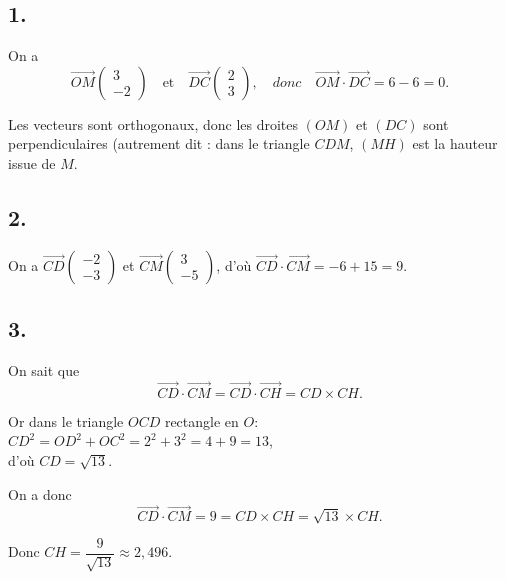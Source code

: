 \subsection*{1.}
	
	On a
	\[
	\overrightarrow{OM} \left( \begin{array}{c} 3 \\ -2 \end{array} \right) \quad \text{et} \quad \overrightarrow{DC} \left( \begin{array}{c} 2 \\ 3 \end{array} \right), \quad donc \quad \overrightarrow{OM} \cdot \overrightarrow{DC} = 6 - 6 = 0.
	\]
	
	Les vecteurs sont orthogonaux, donc les droites \((OM)\) et \((DC)\) sont perpendiculaires (autrement dit : dans le triangle \(CDM\), \((MH)\) est la hauteur issue de \(M\).
	
	\subsection*{2.}
	
	On a
$\overrightarrow{CD} \left( \begin{array}{c} -2 \\ -3 \end{array} \right)$ et  $\overrightarrow{CM} \left( \begin{array}{c} 3 \\ -5 \end{array} \right)$,  d'où  $\overrightarrow{CD} \cdot \overrightarrow{CM} = -6 + 15 = 9$.
	
	
	\subsection*{3.}
	
	On sait que
	\[
	\overrightarrow{CD} \cdot \overrightarrow{CM} = \overrightarrow{CD} \cdot \overrightarrow{CH} = CD \times CH.
	\]
	
	Or dans le triangle $OCD$ rectangle en \(O\):\\
	 \(CD^2 = OD^2 + OC^2 = 2^2 + 3^2 = 4 + 9 = 13\),\\ d'où \(CD = \sqrt{13}\).
	
	On a donc
	\[
	\overrightarrow{CD} \cdot \overrightarrow{CM} = 9 = CD \times CH = \sqrt{13} \times CH.
	\]
	
	Donc \(CH = \dfrac{9}{\sqrt{13}} \approx 2,496\).
